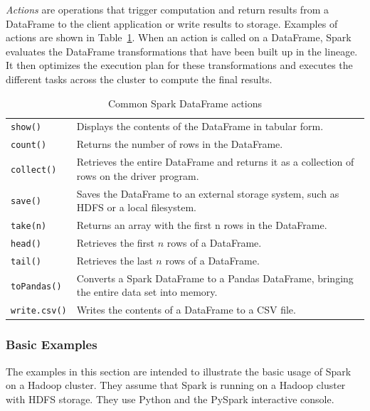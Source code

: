 \emph{Actions} are operations that trigger computation and return results from a DataFrame to the client application or write results to storage. Examples of actions are shown in Table~\ref{tab:sparkactions}. When an action is called on a DataFrame, Spark evaluates the DataFrame transformations that have been built up in the lineage. It then optimizes the execution plan for these transformations and executes the different tasks across the cluster to compute the final results.

\begin{table}
\renewcommand{\arraystretch}{1.25}

\begin{tabularx}{\textwidth}{l|X} \hline
\texttt{show()} & Displays the contents of the DataFrame in tabular form.\\
\texttt{count()} & Returns the number of rows in the DataFrame.\\
\texttt{collect()} & Retrieves the entire DataFrame and returns it as a collection of rows on the driver program.\\
\texttt{save()} & Saves the DataFrame to an external storage system, such as HDFS or a local filesystem.\\
\texttt{take(n)} & Returns an array with the first n rows in the DataFrame.\\
\texttt{head()} & Retrieves the first $n$ rows of a DataFrame.\\
\texttt{tail()} & Retrieves the last $n$ rows of a DataFrame.\\
\texttt{toPandas()} & Converts a Spark DataFrame to a Pandas DataFrame, bringing the entire data set into memory.\\
\texttt{write.csv()} & Writes the contents of a DataFrame to a CSV file.\\ \hline
\end{tabularx}
\caption{Common Spark DataFrame actions}
\label{tab:sparkactions}
\end{table}

\subsubsection*{Basic Examples}

The examples in this section are intended to illustrate the basic usage of Spark on a Hadoop cluster. They assume that Spark is running on a Hadoop cluster with HDFS storage. They use Python and the PySpark interactive console.

